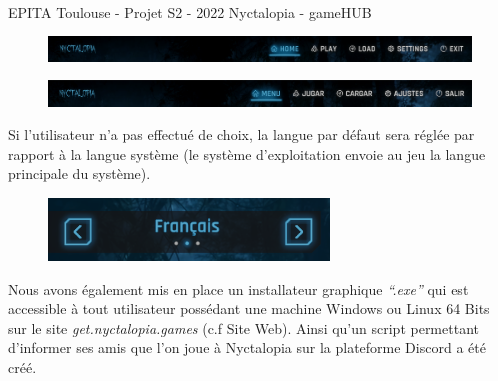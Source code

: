 \vfill
\noindent\makebox[\linewidth]{\rule{.8\paperwidth}{.6pt}}\\[0.2cm]
EPITA Toulouse - Projet S2 - 2022 \hfill Nyctalopia - gameHUB
\noindent\makebox[\linewidth]{\rule{.8\paperwidth}{.6pt}}

\begin{figure}[H]
\centering
\begin{minipage}{.5\textwidth}
  \centering
  \centerline{\includegraphics[width=2\linewidth]{img/uwufolder/en.png}}
  \label{fig:en}
\end{minipage}%
\end{figure}

\begin{figure}[H]
\centering
\begin{minipage}{.5\textwidth}
  \centering
  \centerline{\includegraphics[width=2\linewidth]{img/uwufolder/es.png}}
  \label{fig:es}
\end{minipage}%
\end{figure}

Si l'utilisateur n'a pas effectué de choix, la langue par défaut sera réglée par rapport à la langue système (le système d'exploitation envoie au jeu la langue principale du système).

\begin{figure}[H]
\centering
\begin{minipage}{.5\textwidth}
  \centering
  \centerline{\includegraphics[width=1\linewidth]{img/uwufolder/selector.png}}
  \label{fig:languageselector}
\end{minipage}%
\end{figure}

Nous avons également mis en place un installateur graphique \emph{``.exe''} qui est accessible à tout utilisateur possédant une machine Windows ou Linux 64 Bits sur le site \emph{get.nyctalopia.games} (c.f Site Web). Ainsi qu'un script permettant d'informer ses amis que l'on joue à Nyctalopia sur la plateforme Discord a été créé.

